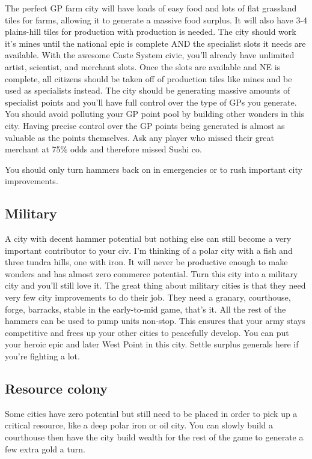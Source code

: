 \documentclass[10pt]{article}
\begin{document}
The perfect GP farm city will have loads of easy food and lots of flat
grassland tiles for farms, allowing it to generate a massive food
surplus. It will also have 3-4 plains-hill tiles for production with
production is needed. The city should work it's mines until the
national epic is complete AND the specialist slots it needs are
available. With the awesome Caste System civic, you'll already have
unlimited artist, scientist, and merchant slots. Once the slots are
available and NE is complete, all citizens should be taken off of
production tiles like mines and be used as specialists instead. The
city should be generating massive amounts of specialist points and
you'll have full control over the type of GPs you generate. You should
avoid polluting your GP point pool by building other wonders in this
city. Having precise control over the GP points being generated is
almost as valuable as the points themselves. Ask any player who missed
their great merchant at 75\% odds and therefore missed Sushi co.

You should only turn hammers back on in emergencies or to rush important city improvements.

\subsection*{Military}

A city with decent hammer potential but nothing else can still become
a very important contributor to your civ. I'm thinking of a polar city
with a fish and three tundra hills, one with iron. It will never be
productive enough to make wonders and has almost zero commerce
potential. Turn this city into a military city and you'll still love
it. The great thing about military cities is that they need very few
city improvements to do their job. They need a granary, courthouse,
forge, barracks, stable in the early-to-mid game, that's it. All the
rest of the hammers can be used to pump units non-stop.  This ensures
that your army stays competitive and frees up your other cities to
peacefully develop. You can put your heroic epic and later West Point
in this city. Settle surplus generals here if you're fighting a lot.

\subsection*{Resource colony}

Some cities have zero potential but still need to be placed in order
to pick up a critical resource, like a deep polar iron or oil
city. You can slowly build a courthouse then have the city build
wealth for the rest of the game to generate a few extra gold a turn.
\end{document}
